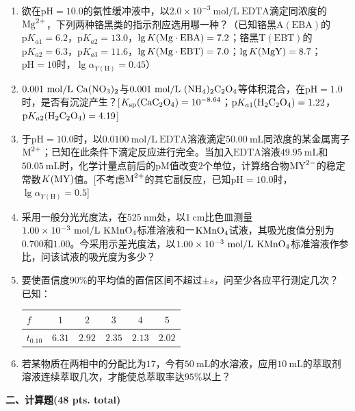 \begin{enumerate}[label=\arabic*., itemsep=1.5ex]
    \item 欲在$\mathrm{pH}=10.0$的氨性缓冲液中，以$2.0\times10^{-3}\ \mathrm{mol/L}\ \mathrm{EDTA}$滴定同浓度的$\ce{Mg^{2+}}$，下列两种铬黑类的指示剂应选用哪一种？（已知铬黑$\mathrm{A(EBA)}$的$\mathrm{p}K_{a1}=6.2$，$\mathrm{p}K_{a2}=13.0$，$\lg K(\ce{Mg\cdot EBA})=7.2$；铬黑$\mathrm{T(EBT)}$的$\mathrm{p}K_{a2}=6.3$，$\mathrm{p}K_{a3}=11.6$，$\lg K(\ce{Mg\cdot EBT})=7.0$；$\lg K(\ce{MgY})=8.7$；$\mathrm{pH}=10$时，$\lg\alpha_{Y(\mathrm{H})}=0.45$）
    \item $0.001\ \mathrm{mol/L}\ \ce{Ca(NO3)2}$与$0.001\ \mathrm{mol/L}\ \ce{(NH4)2C2O4}$等体积混合，在$\mathrm{pH}=1.0$时，是否有沉淀产生？[$K_{\mathrm{sp}}(\ce{CaC2O4})=10^{-8.64}$；$\mathrm{p}K_{a1}(\ce{H2C2O4})=1.22$，$\mathrm{p}K_{a2}(\ce{H2C2O4})=4.19$]
    \item 于$\mathrm{pH}=10.0$时，以$0.0100\ \mathrm{mol/L}\ \mathrm{EDTA}$溶液滴定$50.00\ \mathrm{mL}$同浓度的某金属离子$\ce{M^{2+}}$；已知在此条件下滴定反应进行完全。当加入$\mathrm{EDTA}$溶液$49.95\ \mathrm{mL}$和$50.05\ \mathrm{mL}$时，化学计量点前后的$\mathrm{pM}$值改变$2$个单位，计算络合物$\ce{MY^{2-}}$的稳定常数$K(\ce{MY})$值。[不考虑$\ce{M^{2+}}$的其它副反应，已知$\mathrm{pH}=10.0$时，$\lg\alpha_{Y(\mathrm{H})}=0.5$]
    \item 采用一般分光光度法，在$525\ \mathrm{nm}$处，以$1\ \mathrm{cm}$比色皿测量$1.00\times10^{-3}\ \mathrm{mol/L}\ \ce{KMnO4}$标准溶液和一$\ce{KMnO4}$试液，其吸光度值分别为$0.700$和$1.00$。今采用示差光度法，以$1.00\times10^{-3}\ \mathrm{mol/L}\ \ce{KMnO4}$标准溶液作参比，问该试液的吸光度为多少？
    \item 要使置信度$90\%$的平均值的置信区间不超过$\pm s$，问至少各应平行测定几次？
    \\
    已知：
    \begin{center}
    \begin{tabular}{l|ccccc}
    $f$ & $1$ & $2$ & $3$ & $4$ & $5$ \\
    \hline
    $t_{0.10}$ & $6.31$ & $2.92$ & $2.35$ & $2.13$ & $2.02$ \\
    \end{tabular}
    \end{center}
    \item 若某物质在两相中的分配比为$17$，今有$50\ \mathrm{mL}$的水溶液，应用$10\ \mathrm{mL}$的萃取剂溶液连续萃取几次，才能使总萃取率达$95\%$以上？
\end{enumerate}

\vspace{0.5cm}
\noindent\textbf{二、计算题(48 pts. total)}

